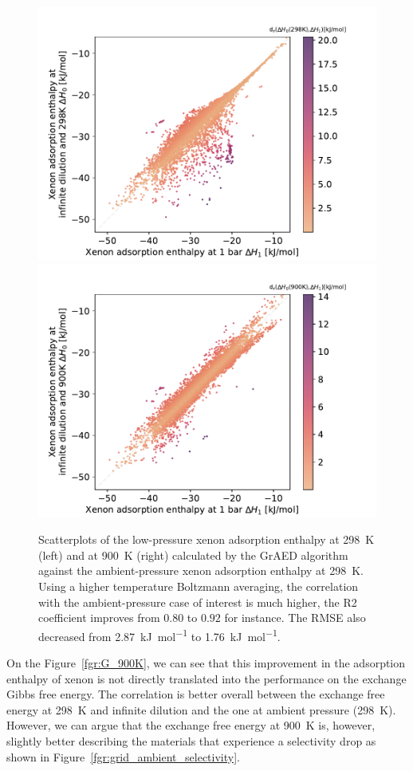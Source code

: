 \documentclass[main]{subfiles}
\begin{document}
\begin{figure}[ht]
\centering
  \includegraphics[width=0.45\linewidth]{figures/4-ml/SI_figure/Scatterplot_H1_H0.pdf}
  \includegraphics[width=0.45\linewidth]{figures/4-ml/SI_figure/Scatterplot_H1_H900K.pdf}
  \caption{Scatterplots of the low-pressure xenon adsorption enthalpy at \SI{298}{\kelvin} (left) and at \SI{900}{\kelvin} (right) calculated by the GrAED algorithm against the ambient-pressure xenon adsorption enthalpy at \SI{298}{\kelvin}. Using a higher temperature Boltzmann averaging, the correlation with the ambient-pressure case of interest is much higher, the R2 coefficient improves from $0.80$ to $0.92$ for instance. The RMSE also decreased from \SI{2.87}{\kilo\joule\per\mole} to \SI{1.76}{\kilo\joule\per\mole}. }\label{fgr:H_900K}
\end{figure}

On the Figure~\ref{fgr:G_900K}, we can see that this improvement in the adsorption enthalpy of xenon is not directly translated into the performance on the exchange Gibbs free energy. The correlation is better overall between the exchange free energy at \SI{298}{\kelvin} and infinite dilution and the one at ambient pressure (\SI{298}{\kelvin}). However, we can argue that the exchange free energy at \SI{900}{\kelvin} is, however, slightly better describing the materials that experience a selectivity drop as shown in Figure~\ref{fgr:grid_ambient_selectivity}. 
\end{document}
